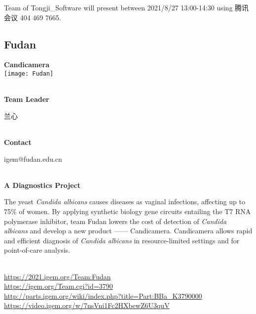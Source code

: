 \vfill{}









Team of Tongji\_Software will present between 2021/8/27 13:00-14:30        using 腾讯会议 404 469 7665.
\newpage


\subsection{\textcolor{Blu}{ Fudan } }
\vspace{5mm}
\begin{center}
\large{
  \textbf{ Candicamera }\\

  \texttt{[image: Fudan]}
}
\end{center}
\textbf{\\Team Leader}

  兰心


\textbf{\\Contact}

  igem@fudan.edu.cn


\textbf{\\A Diagnostics Project\\}\begin{spacing}{1.5}

The yeast \textit{Candida albicans} causes diseases as vaginal infections, affecting up to 75\% of women. By applying synthetic biology gene circuits entailing the T7 RNA polymerase inhibitor, team Fudan lowers the cost of detection of \textit{Candida albicans} and develop a new product —— Candicamera. Candicamera allows rapid and efficient diagnosis of \textit{Candida albicans} in resource-limited settings and for point-of-care analysis.\end{spacing}
\\

\url{https://2021.igem.org/Team:Fudan }\\
\url{https://igem.org/Team.cgi?id=3790 }\\
\url{http://parts.igem.org/wiki/index.php?title=Part:BBa_K3790000 }\\
\url{https://video.igem.org/w/7nsVni1Fc2HXbewZ6U3quV }\\

\vfill{}









